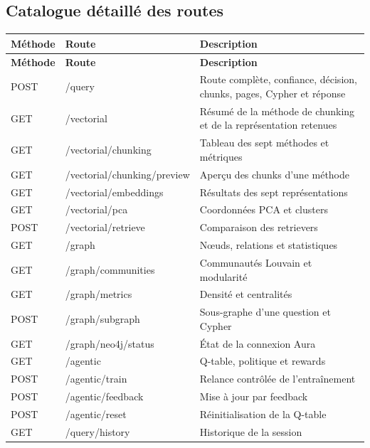 \documentclass[12pt,a4paper,oneside]{report}
\begin{document}
\begin{appendices}
\section{Catalogue détaillé des routes}
\begin{longtable}{p{}p{}p{}}
\toprule
\textbf{Méthode} & \textbf{Route} & \textbf{Description}\\
\midrule
\endfirsthead
\toprule
\textbf{Méthode} & \textbf{Route} & \textbf{Description}\\
\midrule
\endhead
POST & /query & Route complète, confiance, décision, chunks, pages, Cypher et réponse\\
GET & /vectorial & Résumé de la méthode de chunking et de la représentation retenues\\
GET & /vectorial/chunking & Tableau des sept méthodes et métriques\\
GET & /vectorial/chunking/preview & Aperçu des chunks d'une méthode\\
GET & /vectorial/embeddings & Résultats des sept représentations\\
GET & /vectorial/pca & Coordonnées PCA et clusters\\
POST & /vectorial/retrieve & Comparaison des retrievers\\
GET & /graph & Nœuds, relations et statistiques\\
GET & /graph/communities & Communautés Louvain et modularité\\
GET & /graph/metrics & Densité et centralités\\
POST & /graph/subgraph & Sous-graphe d'une question et Cypher\\
GET & /graph/neo4j/status & État de la connexion Aura\\
GET & /agentic & Q-table, politique et rewards\\
POST & /agentic/train & Relance contrôlée de l'entraînement\\
POST & /agentic/feedback & Mise à jour par feedback\\
POST & /agentic/reset & Réinitialisation de la Q-table\\
GET & /query/history & Historique de la session\\
\bottomrule
\end{longtable}


\end{appendices}
\end{document}
